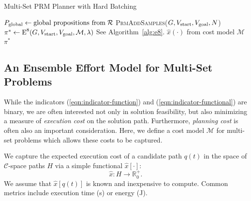 \begin{algorithm}
\caption{Multi-Set PRM Planner with Hard Batching}
\label{alg:multi-set-prm-hard}
\begin{algorithmic}[1]
\State $P_{\mbox{\scriptsize global}} \leftarrow
   \mbox{global propositions from\;} \mathcal{R}$
\Loop
   \State \textsc{PrmAddSamples}($G,
      V_{\mbox{\scriptsize start}}, V_{\mbox{\scriptsize goal}},
      N$)
   \State $\pi^* \leftarrow \mbox{E}^8(G,
      V_{\mbox{\scriptsize start}}, V_{\mbox{\scriptsize goal}},
      \mathcal{M}, \lambda)$
      \Comment See Algorithm~\ref{alg:e8}.
      \Comment $\hat{x}(\cdot)$ from cost model $\mathcal{M}$
      \State \Return $\pi^*$
   \EndIf
\EndLoop
\EndProcedure
\end{algorithmic}
\end{algorithm}

\subsection{An Ensemble Effort Model for Multi-Set Problems}
\label{subsec:cost-model}

While the indicators
(\ref{eqn:indicator-function}) and (\ref{eqn:indicator-functional})
are binary,
we are often interested not only in solution feasibility,
but also minimizing a measure of \emph{execution cost}
on the solution path.
Furthermore,
\emph{planning cost} is often also an important consideration.
Here,
we define a cost model $\mathcal{M}$
for multi-set problems
which allows these costs to be captured.

We capture the expected execution cost of a candidate path
$q(t)$ in the space of $\mathcal{C}$-space paths $H$
via a simple functional ${\hat x}[\cdot]$:
\begin{equation}
  \hat{x} : H \rightarrow \mathbb{R}_0^+ .
\end{equation}
We assume that $\hat{x}[q(t)]$ is known and inexpensive to compute.
Common metrics include
execution time (s) or energy (J).

